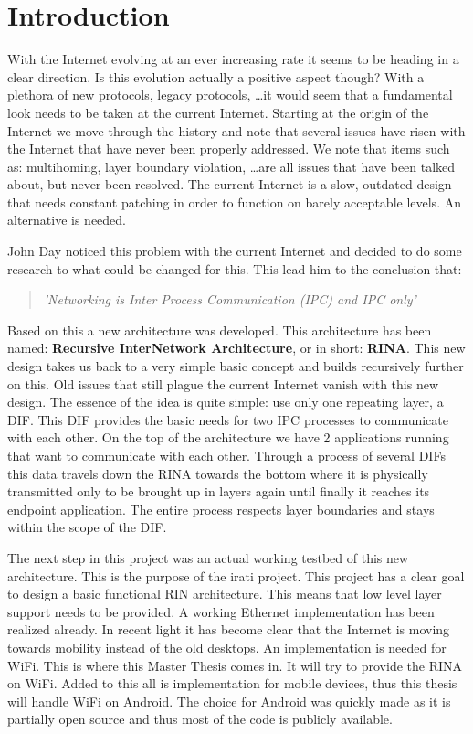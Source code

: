 \chapter{Introduction}

With the Internet evolving at an ever increasing rate it seems to be heading in a clear direction. Is this evolution actually a positive aspect though? With a plethora of new protocols, legacy protocols, \ldots it would seem that a fundamental look needs to be taken at the current Internet. Starting at the origin of the Internet we move through the history and note that several issues have risen with the Internet that have never been properly addressed. We note that items such as: multihoming, layer boundary violation, \ldots are all issues that have been talked about, but never been resolved. The current Internet is a slow, outdated design that needs constant patching in order to function on barely acceptable levels. An alternative is needed. 

\npar

John Day noticed this problem with the current Internet and decided to do some research to what could be changed for this. This lead him to the conclusion that:

\begin{quote}
	\emph{'Networking is Inter Process Communication (IPC) and IPC only' \citep{johnday2008}}
\end{quote}

Based on this a new architecture was developed. This architecture has been named: \textbf{Recursive InterNetwork Architecture}, or in short: \textbf{RINA}. This new design takes us back to a very simple basic concept and builds recursively further on this. Old issues that still plague the current Internet vanish with this new design. The essence of the idea is quite simple: use only one repeating layer, a DIF. This DIF provides the basic needs for two IPC processes to communicate with each other. On the top of the architecture we have 2 applications running that want to communicate with each other. Through a process of several DIFs this data travels down the RINA towards the bottom where it is physically transmitted only to be brought up in layers again until finally it reaches its endpoint application. The entire process respects layer boundaries and stays within the scope of the DIF.

\npar

The next step in this project was an actual working testbed of this new architecture. This is the purpose of the irati project. This project has a clear goal to design a basic functional RIN architecture. This means that low level layer support needs to be provided. A working Ethernet implementation has been realized already. In recent light it has become clear that the Internet is moving towards mobility instead of the old desktops. An implementation is needed for WiFi. This is where this Master Thesis comes in. It will try to provide the RINA on WiFi. Added to this all is implementation for mobile devices, thus this thesis will handle WiFi on Android. The choice for Android was quickly made as it is partially open source and thus most of the code is publicly available.

